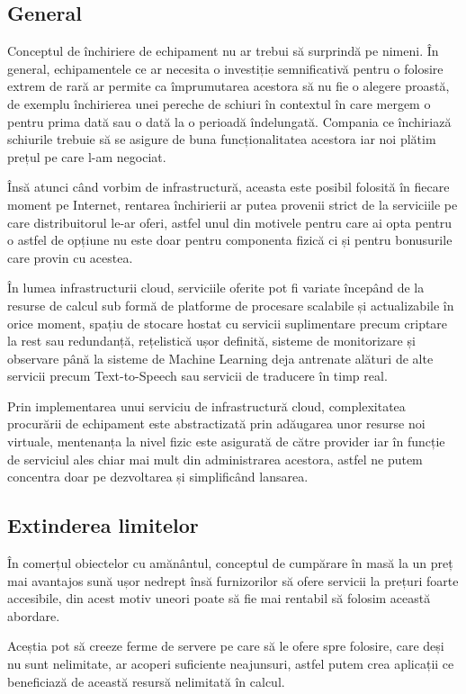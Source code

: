 \subsection{General}
Conceptul de închiriere de echipament nu ar trebui să surprindă pe nimeni. În general, echipamentele
ce ar necesita o investiție semnificativă pentru o folosire extrem de rară ar permite ca împrumutarea
acestora să nu fie o alegere proastă, de exemplu închirierea unei pereche de schiuri în contextul
în care mergem o pentru prima dată sau o dată la o perioadă îndelungată. Compania ce închiriază schiurile
trebuie să se asigure de buna funcționalitatea acestora iar noi plătim prețul pe care l-am negociat.

Însă atunci când vorbim de infrastructură, aceasta este posibil folosită în fiecare moment pe Internet,
rentarea închirierii ar putea provenii strict de la serviciile pe care distribuitorul le-ar oferi, astfel
unul din motivele pentru care ai opta pentru o astfel de opțiune nu este doar pentru componenta fizică
ci și pentru bonusurile care provin cu acestea.

În lumea infrastructurii cloud, serviciile oferite pot fi variate începând de la resurse de calcul sub formă
de platforme de procesare scalabile și actualizabile în orice moment, spațiu de stocare hostat cu servicii suplimentare
precum criptare la rest sau redundanță, rețelistică ușor definită, sisteme de monitorizare și observare până la sisteme 
de Machine Learning deja antrenate alături de alte servicii precum Text-to-Speech sau servicii de traducere în timp real.

Prin implementarea unui serviciu de infrastructură cloud, complexitatea procurării de echipament este abstractizată
prin adăugarea unor resurse noi virtuale, mentenanța la nivel fizic este asigurată de către provider iar în funcție
de serviciul ales chiar mai mult din administrarea acestora, astfel ne putem concentra doar pe dezvoltarea și simplificând
lansarea.

\subsection{Extinderea limitelor}

În comerțul obiectelor cu amănântul, conceptul de cumpărare în masă la un preț mai avantajos sună ușor nedrept
însă furnizorilor să ofere servicii la prețuri foarte accesibile, din acest motiv uneori poate să fie mai 
rentabil să folosim această abordare.

Aceștia pot să creeze ferme de servere pe care să le ofere spre folosire, care deși nu sunt nelimitate, 
ar acoperi suficiente neajunsuri, astfel putem crea aplicații ce beneficiază de această resursă nelimitată în calcul.

